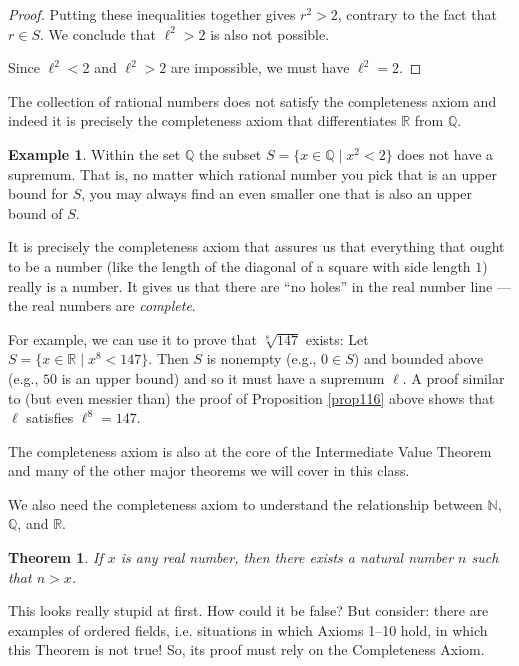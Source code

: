 \documentclass[12pt]{amsart}
\newcommand{\Q}{\mathbb{Q}}
\newcommand{\R}{{\mathbb{R}}}
\newcommand{\N}{\mathbb{N}}
\numberwithin{equation}{section}
\theoremstyle{plain} %
\newtheorem{thm}[equation]{Theorem}
\theoremstyle{definition}
\newtheorem{ex}[equation]{Example}
\theoremstyle{remark}
\begin{document}
\begin{proof}
Putting these inequalities together gives $r^2 > 2$, contrary to the fact that $r \in S$. We conclude that $\ell^2 > 2$ is also not possible.

Since $\ell^2 < 2$ and $\ell^2 > 2$ are impossible, we must have $\ell^2 = 2$.
\end{proof}



The collection of rational numbers does not satisfy the completeness axiom and indeed it is precisely the completeness axiom that differentiates $\R$ from
$\Q$. 

\begin{ex} Within the set $\Q$ the subset $S = \{x \in \Q \mid x^2 < 2\}$ does not have a supremum. That is, no matter which rational number you pick that is an
  upper bound for $S$, you may always find an even smaller one that is also an upper bound of $S$. 
\end{ex}

It is precisely the completeness axiom that assures us that everything that ought to be a number (like the length of the diagonal of a square with side length $1$) really is a number.  It gives us that there are ``no holes'' in the real number line --- the real numbers are {\em
  complete}. 


For example, we can use it to prove that $\sqrt[8]{147}$ exists: Let $S = \{ {x \in \R} \mid x^8 < 147\}$. Then $S$ is nonempty (e.g., $0 \in S$) and bounded above
(e.g., $50$ is an upper bound) and so it must have a supremum $\ell$. 
A proof similar to (but even messier than) the proof of Proposition \ref{prop116} above shows
that $\ell$ satisfies $\ell^8 = 147$. 

The completeness axiom is also at the core of the Intermediate Value Theorem and many of the other major theorems we will
cover in this class. 

We also need the completeness axiom to understand the relationship between $\N$, $\Q$, and $\R$.

\begin{thm} \label{thm120}
If $x$ is any real number, then there exists a natural number $n$ such that $n > x$.
\end{thm}

This looks really stupid at first. How could it be false? But consider: there are examples of ordered fields, i.e. situations in which Axioms 1--10 
hold, in which this Theorem is not true! So, its proof must rely on the Completeness Axiom. 
\end{document}
